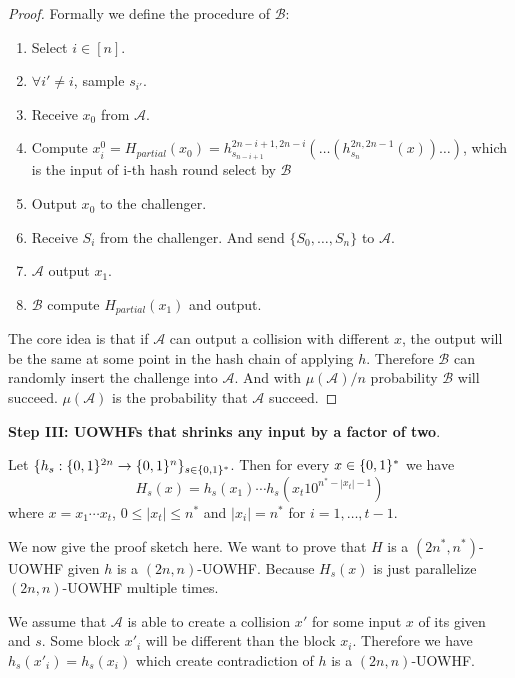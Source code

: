 \begin{proof}
    Formally we define the procedure of $\mathcal{B}$:
    \begin{enumerate}
        \item Select $i\in [n]$.
        \item $\forall i'\neq i$, sample $s_{i'}$.
        \item Receive $x_0$ from $\mathcal{A}$.
        \item Compute $x_i^0 = H_{partial}(x_0)=h_{s_{n-i+1}}^{2n-i+1,2n-i}(\dots(h_{s_n}^{2n,2n-1}(x))\dots)$, which is the input of i-th hash round select by $\mathcal{B}$
        \item Output $x_0$ to the challenger.
        \item Receive $S_{i}$ from the challenger. And send $\{S_0,\dots,S_n\}$ to $\mathcal{A}$.
        \item $\mathcal{A}$ output $x_1$.
        \item $\mathcal{B}$ compute $H_{partial}(x_1)$ and output.
    \end{enumerate}

The core idea is that if $\mathcal{A}$ can output a collision with different $x$, the output will be the same at some point in the hash chain of applying $h$. 
Therefore $\mathcal{B}$ can randomly insert the challenge into $\mathcal{A}$.
And with $\mu(\mathcal{A})/n$ probability $\mathcal{B}$ will succeed.  $\mu(\mathcal{A})$ is the probability that $\mathcal{A}$ succeed. 
\end{proof}

\noindent\textbf{Step III: UOWHFs that shrinks any input by a factor of two}.

\begin{construction}
    Let $\{h_s:\{0,1\}^{2n}\rightarrow\{0,1\}^{n}\}_{s\in\{0,1\}^{*}}$. Then for every $x\in\{0,1\}^{*}$ we have
    \[
    H_s(x)=h_s(x_1)\cdots h_s(x_{t}10^{n^{*}-|x_t|-1})
    \]
    where $x=x_1\cdots x_t$, $0\leq|x_t|\leq n^{*}$ and $|x_i|=n^{*}$ for $i=1,\dots,t-1$.
\end{construction}

We now give the proof sketch here. 
We want to prove that $H$ is a $(2n^{*}, n^{*})$-UOWHF given $h$ is a $(2n, n)$-UOWHF.
Because $H_s(x)$ is just parallelize $(2n, n)$-UOWHF multiple times. 

We assume that $\mathcal{A}$ is able to create a collision $x'$ for some input $x$ of its given and $s$.
Some block $x'_i$ will be different than the block $x_i$. 
Therefore we have $h_s(x'_i)=h_s(x_i)$ which create contradiction of $h$ is a $(2n, n)$-UOWHF.

